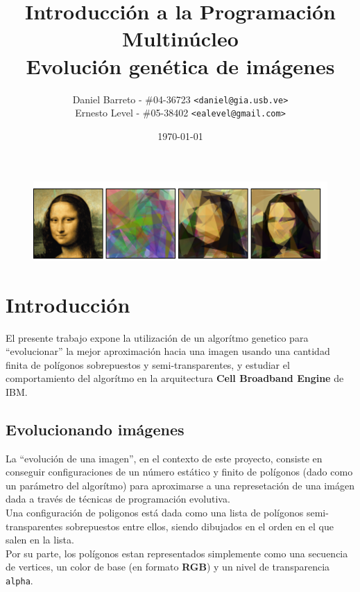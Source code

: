 \documentclass[11pt, spanish]{article}
\begin{document}
\title{Introducción a la Programación Multinúcleo\\Evolución genética de imágenes}
\author{
  Daniel Barreto - \#04-36723 \texttt{<daniel@gia.usb.ve>}\\
  Ernesto Level - \#05-38402 \texttt{<ealevel@gmail.com>}
}
\date{\today}

\maketitle

\begin{figure}[htp]
  \centering
  \includegraphics[scale=0.7]{media/evolution.png}
\end{figure}

\section{Introducción}
El presente trabajo expone la utilización de un algorítmo genetico
para ``evolucionar'' la mejor aproximación hacia una imagen usando una
cantidad finita de polígonos sobrepuestos y semi-transparentes, y
estudiar el comportamiento del algorítmo en la arquitectura
\textbf{Cell Broadband Engine} de IBM.

\subsection{Evolucionando imágenes}
La ``evolución de una imagen'', en el contexto de este proyecto,
consiste en conseguir configuraciones de un número estático y finito
de polígonos (dado como un parámetro del algorítmo) para aproximarse a
una represetación de una imágen dada a través de técnicas de
programación evolutiva.\\

Una configuración de poligonos está dada como una lista de polígonos
semi-transparentes sobrepuestos entre ellos, siendo dibujados en el
orden en el que salen en la lista.\\

Por su parte, los polígonos estan representados simplemente como una
secuencia de vertices, un color de base (en formato \textbf{RGB}) y un
nivel de transparencia \texttt{alpha}.\\
\end{document}
